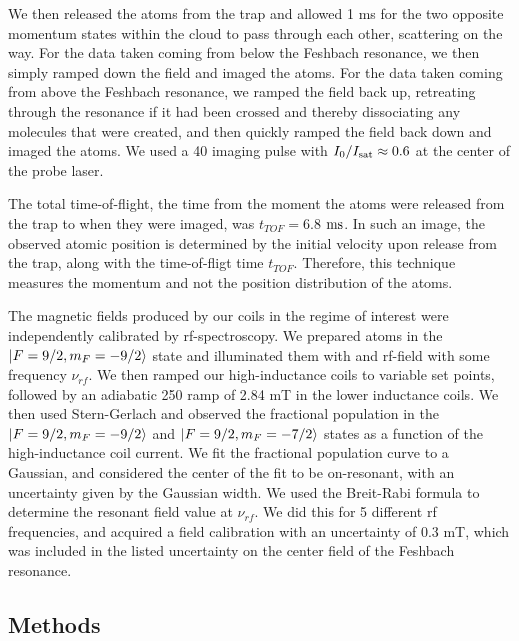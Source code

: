 \documentclass[12pt]{iopart}
\begin{document}
We then released the atoms from the trap and allowed 1 ms for the two opposite momentum states within the cloud to pass through each other, scattering on the way. For the data taken coming from below the Feshbach resonance, we then simply ramped down the field and imaged the atoms. For the data taken coming from above the Feshbach resonance, we ramped the field back up, retreating through the resonance if it had been crossed and thereby dissociating any molecules that were created, and then quickly ramped the field back down and imaged the atoms. We used a 40 \us{} imaging pulse with $I_0/I_{\rm{sat}}\approx 0.6$ at the center of the probe laser.

The total time-of-flight, the time from the moment the atoms were released from the trap to when they were imaged, was $t_{TOF}=6.8$ $\rm{ms}$. In such an image, the observed atomic position is determined by the initial velocity upon release from the trap, along with the time-of-fligt time $t_{TOF}$. Therefore, this technique measures the momentum and not the position distribution of the atoms.

The magnetic fields produced by our coils in the regime of interest were independently calibrated by rf-spectroscopy. We prepared \K{} atoms in the $\mathinner{|{F=9/2, m_F=-9/2}\rangle}$ state and illuminated them with and rf-field with some frequency $\nu_{rf}$. We then ramped our high-inductance coils to variable set points, followed by an adiabatic 250\us{} ramp of 2.84 mT in the lower inductance coils. We then used Stern-Gerlach and observed the fractional population in the $\mathinner{|{F=9/2, m_F=-9/2}\rangle}$  and $\mathinner{|{F=9/2, m_F=-7/2}\rangle}$ states as a function of the high-inductance coil current. We fit the fractional population curve to a Gaussian, and considered the center of the fit to be on-resonant, with an uncertainty given by the Gaussian width. We used the Breit-Rabi formula to determine the resonant field value at $\nu_{rf}$. We did this for 5 different rf frequencies, and acquired a field calibration with an uncertainty of 0.3 mT, which was included in the listed uncertainty on the center field of the Feshbach resonance.


\subsection{Methods}
\end{document}
